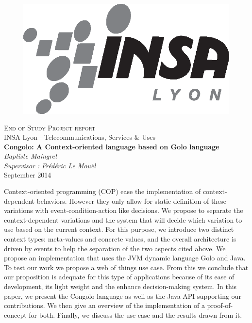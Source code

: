 \documentclass[a4paper]{article}
\begin{document}
%
%

\pagestyle{empty}
\begin{center}
\begin{figure}%
\centering
\includegraphics[width=0.4\columnwidth]{logo/insa-noir.eps}
\end{figure}
{\LARGE \textsc{End of Study Project report}} \\ %
\vspace{0.5cm}
{INSA Lyon - Telecommunications, Services \& Uses} \\
\vspace{2cm}
{\Large \textbf{Congolo: A Context-oriented language based on Golo language}} \\
\vspace{10pt}
{\large \textit{Baptiste Maingret}} \\
{\large \textit{Supervisor : Frédéric Le Mouël}} \\
\vspace{10pt}
{\large September 2014} \\
\vspace{20pt}
\begin{minipage}{0.8\columnwidth}
\sffamily
\small
Context-oriented programming (COP) ease the implementation of context-dependent behaviors. However they only allow for static definition of these variations with event-condition-action like decisions. We propose to separate the context-dependent variations and the system that will decide which variation to use based on the current context. For this purpose, we introduce two distinct context types: meta-values and concrete values, and the overall architecture is driven by events to help the separation of the two aspects cited above. We propose an implementation that uses the JVM dynamic language Golo and Java. To test our work we propose a web of things use case. From this we conclude that our proposition is adequate for this type of applications because of its ease of development, its light weight and the enhance decision-making system. In this paper, we present the Congolo language as well as the Java API supporting our contributions. We then give an overview of the implementation of a proof-of-concept for both. Finally, we discuss the use case and the results drawn from it.
\end{minipage}
\end{center}
\end{document}
